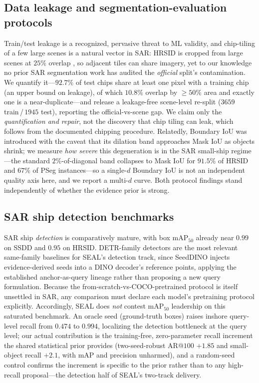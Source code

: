 \documentclass[journal]{IEEEtran}
\begin{document}
\subsection{Data leakage and segmentation-evaluation protocols}
Train/test leakage is a recognized, pervasive threat to ML validity, and chip-tiling of a few large scenes is a natural vector in SAR: HRSID is cropped from large scenes at $25\%$ overlap \cite{wei2020hrsid}, so adjacent tiles can share imagery, yet to our knowledge no prior SAR segmentation work has audited the \emph{official} split's contamination. We quantify it---$92.7\%$ of test chips share at least one pixel with a training chip (an upper bound on leakage), of which $10.8\%$ overlap by $\ge\!50\%$ area and exactly one is a near-duplicate---and release a leakage-free scene-level re-split ($3659$ train\,/\,$1945$ test), reporting the official-vs-scene gap. We claim only the \emph{quantification and repair}, not the discovery that chip tiling can leak, which follows from the documented chipping procedure. Relatedly, Boundary IoU \cite{cheng2021boundary} was introduced with the caveat that its dilation band approaches Mask IoU as objects shrink; we measure \emph{how severe} this degeneration is in the SAR small-ship regime---the standard $2\%$-of-diagonal band collapses to Mask IoU for $91.5\%$ of HRSID and $67\%$ of PSeg instances---so a single-$d$ Boundary IoU is not an independent quality axis here, and we report a multi-$d$ curve. Both protocol findings stand independently of whether the evidence prior is strong.

\subsection{SAR ship detection benchmarks}
SAR ship \emph{detection} is comparatively mature, with box mAP$_{50}$ already near $0.99$ on SSDD and $0.95$ on HRSID. DETR-family detectors are the most relevant same-family baselines for SEAL's detection track, since SeedDINO injects evidence-derived seeds into a DINO \cite{zhang2023dino} decoder's reference points, applying the established anchor-as-query lineage rather than proposing a new query formulation. Because the from-scratch-vs-COCO-pretrained protocol is itself unsettled in SAR, any comparison must declare each model's pretraining protocol explicitly. Accordingly, SEAL does \emph{not} contest mAP$_{50}$ leadership on this saturated benchmark. An oracle seed (ground-truth boxes) raises inshore query-level recall from $0.474$ to $0.994$, localizing the detection bottleneck at the query level; our actual contribution is the training-free, zero-parameter recall increment the shared statistical prior provides (two-seed-robust AR@$100$ $+1.85$ and small-object recall $+2.1$, with mAP and precision unharmed), and a random-seed control confirms the increment is specific to the prior rather than to any high-recall proposal---the detection half of SEAL's two-track delivery.
\end{document}
